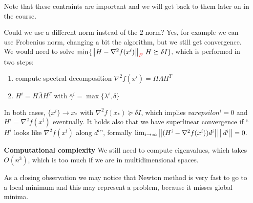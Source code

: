 \documentclass[computational_mathematics.tex]{subfiles}
\begin{document}
\begin{obs}
   Note that these contraints are important and we will get back to them later on in the course.
\end{obs}
 
Could we use a different norm instead of the $2$-norm? Yes, for example we can use Frobenius norm, changing a bit the algorithm, but we still get convergence. We would need to solve $\min \{{\left\lVert H - \nabla^2 f(x^i)\right\rVert}_{{\color{red} F}} ~ H \succeq \delta I\}$, which is performed in two steps:
\begin{enumerate}
  \item compute spectral decomposition $\nabla^2 f(x^i) = H \Lambda H^T$
  \item $H^i = H \bar{\Lambda} H^T$ with $\bar{\gamma}^i = \max \{\lambda^i, \delta\}$
\end{enumerate}
In both cases, $\{x^i\} \to x_*$ with $\nabla^2 f(x_*) \succeq \delta I$, which implies $varepsilon^i = 0$ and $H^i = \nabla^2 f(x^i)$ eventually. It holds also that we have superlinear convergence if ``$H^i$ looks like $\nabla^2 f(x^i)$ along $d^i$'', formally $\lim_{i \to \infty} \left\lVert(H^i - \nabla^2 f(x^i)) d^i\right\rVert \left\lVert d^i\right\rVert = 0$.

\begin{myframe}{\bf Computational complexity}
We still need to compute eigenvalues, which takes $O(n^3)$, which is too much if we are in multidimensional spaces.
\end{myframe}

As a closing observation we may notice that Newton method is very fast to go to a local minimum and this may represent a problem, because it misses global minima.
\end{document}
